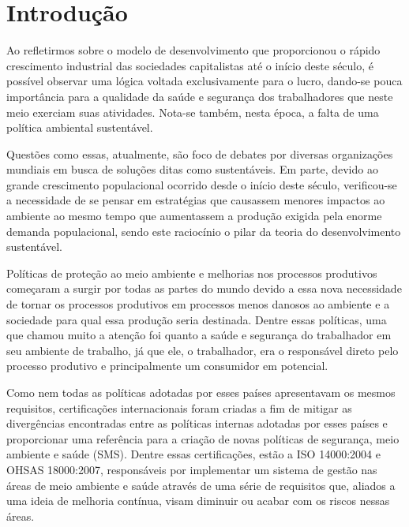 \chapter*[Introdução]{Introdução}

Ao refletirmos sobre o modelo de desenvolvimento que proporcionou o rápido crescimento industrial das sociedades capitalistas até o início deste século, é possível observar uma lógica voltada exclusivamente para o lucro, dando-se pouca importância para a qualidade da saúde e segurança dos trabalhadores que neste meio exerciam suas atividades. Nota-se também, nesta época, a falta de uma política ambiental sustentável.

Questões como essas, atualmente, são foco de debates por diversas organizações mundiais em busca de soluções ditas como sustentáveis. Em parte, devido ao grande crescimento populacional ocorrido desde o início deste século, verificou-se a necessidade de se pensar em estratégias que causassem menores impactos ao ambiente ao mesmo tempo que aumentassem a produção exigida pela enorme demanda populacional, sendo este raciocínio o pilar da teoria do desenvolvimento sustentável.

Políticas de proteção ao meio ambiente e melhorias nos processos produtivos começaram a surgir por todas as partes do mundo devido a essa nova necessidade de tornar os processos produtivos em processos menos danosos ao ambiente e a sociedade para qual essa produção seria destinada. Dentre essas políticas, uma que chamou muito a atenção foi quanto a saúde e segurança do trabalhador em seu ambiente de trabalho, já que ele, o trabalhador, era o responsável direto pelo processo produtivo e principalmente um consumidor em potencial.

Como nem todas as políticas adotadas por esses países apresentavam os mesmos requisitos, certificações internacionais foram criadas a fim de mitigar as divergências encontradas entre as políticas internas adotadas por esses países e proporcionar uma referência para a criação de novas políticas de segurança, meio ambiente e saúde (SMS). Dentre essas certificações, estão a ISO 14000:2004 e OHSAS 18000:2007, responsáveis por implementar um sistema de gestão nas áreas de meio ambiente e saúde através de uma série de requisitos que, aliados a uma ideia de melhoria contínua, visam diminuir ou acabar com os riscos nessas áreas.

